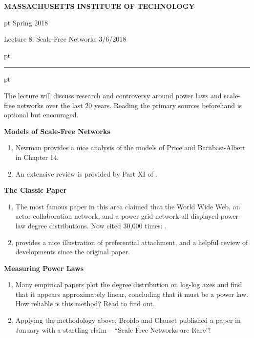 \documentclass[11pt]{article}
\begin{document}
\centerline{\bf MASSACHUSETTS INSTITUTE OF TECHNOLOGY}
\par{} pt  \hfill Spring 2018
\par\noindent Lecture 8: Scale-Free Networks \hfill{3/6/2018}
\par{} pt \hrule \par{} pt

\vspace{10pt}

\noindent

The lecture will discuss research and controversy around power laws and scale-free networks over the last 20 years. Reading the primary sources beforehand is optional but encouraged. 

\vspace{10pt}
\noindent
{\bf Models of Scale-Free Networks}
\begin{enumerate}
	\item Newman \cite{Newman2010} provides a nice analysis of the models of Price and Barabasi-Albert in Chapter 14. 
	\item An extensive review is provided by Part XI of \cite{Dorogovtsev2002}. 
\end{enumerate}

\vspace{10pt}
\noindent
{\bf The Classic Paper}

\begin{enumerate}
	\item The most famous paper in this area claimed that the World Wide Web, an actor collaboration network, and a power grid network all displayed power-law degree distributions.  Now cited 30,000 times: \cite{Barabasi1999}. 
	\item \cite{barabasi2009} provides a nice illustration of preferential attachment, and a helpful review of developments since the original paper. 
\end{enumerate}

\vspace{10pt}
\noindent
{\bf Measuring Power Laws}
\begin{enumerate}
	\item Many empirical papers plot the degree distribution on log-log axes and find that it appears approximately linear, concluding that it must be a power law. How reliable is this method? Read \cite{Clauset2009} to find out. 
	\item Applying the methodology above, Broido and Clauset published a paper \cite{Broido2017} in January with a startling claim -- ``Scale Free Networks are Rare''! 
\end{enumerate}




\fontsize{10}{10}
{}
\end{document}

